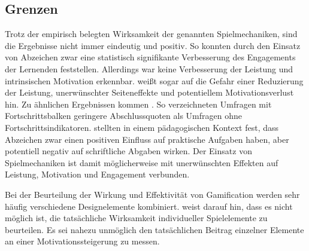 \subsection{Grenzen}
Trotz der empirisch belegten Wirksamkeit der genannten Spielmechaniken, sind die Ergebnisse nicht immer eindeutig und positiv.
So konnten \cite{ortiz_gamification_2017} durch den Einsatz von Abzeichen zwar eine statistisch signifikante Verbesserung des Engagements der Lernenden feststellen.
Allerdings war keine Verbesserung der Leistung und intrinsischen Motivation erkennbar.
\cite{toda_dark_2018} weißt sogar auf die Gefahr einer Reduzierung der Leistung, unerwünschter Seiteneffekte und potentiellem Motivationsverlust hin.
Zu ähnlichen Ergebnissen kommen \cite{liu_examining_2017}.
So verzeichneten Umfragen mit Fortschrittsbalken geringere Abschlussquoten als Umfragen ohne Fortschrittsindikatoren. \cite{dominguez_gamifying_2013} stellten in einem pädagogischen Kontext fest, dass Abzeichen zwar einen positiven Einfluss auf praktische Aufgaben haben, aber potentiell negativ auf schriftliche Abgaben wirken. Der Einsatz von Spielmechaniken ist damit möglicherweise mit unerwünschten Effekten auf Leistung, Motivation und Engagement verbunden.

Bei der Beurteilung der Wirkung und Effektivität von Gamification werden sehr häufig verschiedene Designelemente kombiniert. \citeauthor{mazarakis2018gamification} weist darauf hin, dass es nicht möglich ist, die tatsächliche Wirksamkeit individueller Spielelemente zu beurteilen. Es sei nahezu unmöglich den tatsächlichen Beitrag einzelner Elemente an einer Motivationssteigerung zu messen.

